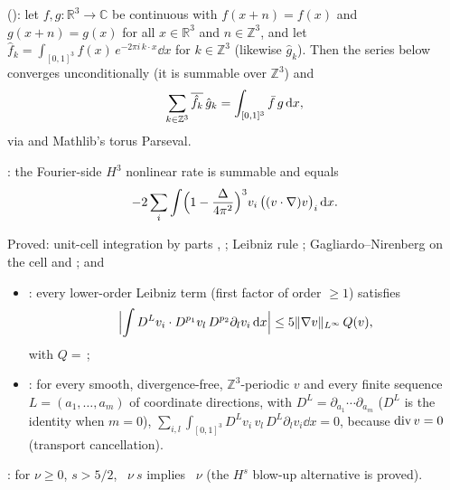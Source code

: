 \documentclass[11pt]{article}
\begin{document}
\begin{theorem}
\coined{} (): let $f,g\colon\mathbb{R}^3\to\mathbb{C}$ be continuous with $f(x+n)=f(x)$ and $g(x+n)=g(x)$ for all $x\in\mathbb{R}^3$ and $n\in\mathbb{Z}^3$, and let $\hat f_k=\int_{[0,1]^3}f(x)\,e^{-2\pi i\,k\cdot x}\dd x$ for $k\in\mathbb{Z}^3$ (likewise $\hat g_k$). Then the series below converges unconditionally (it is summable over $\mathbb{Z}^3$) and
\[
\sum_{k\in\mathbb{Z}^3}\overline{\hat f_k}\,\hat g_k = \int_{[0,1]^3}\bar f\,g\,\mathrm{d} x,
\]
via \coined{} and Mathlib's torus Parseval.
\end{theorem}
\begin{theorem}
\coined: the Fourier-side $H^3$ nonlinear rate is summable and equals
\[
-2\sum_i\int \Bigl(1-\frac{\Delta}{4\pi^2}\Bigr)^{3} v_i\,\bigl((v\cdot\nabla)v\bigr)_i\,\mathrm{d} x .
\]
\end{theorem}
\begin{theorem}[Kato--Ponce toolkit, $s=3$; \file{KatoPonce.lean}]
Proved: unit-cell integration by parts \coined, \coined; Leibniz rule \coined; Gagliardo--Nirenberg on the cell \coined{} and \coined; and
\begin{itemize}
\item {}\coined: every lower-order Leibniz term (first factor of order $\ge1$) satisfies
\[
\Bigl|\int D^L v_i\cdot D^{p_1}v_l\, D^{p_2}\partial_l v_i\,\mathrm{d} x\Bigr|\le 5\lVert\nabla v\rVert_{L^\infty}\,Q(v),
\]
with $Q=$\,\coined;
\item {}\coined: for every smooth, divergence-free, $\mathbb{Z}^3$-periodic $v$ and every finite sequence $L=(a_1,\dots,a_m)$ of coordinate directions, with $D^L=\partial_{a_1}\cdots\partial_{a_m}$ ($D^L$ is the identity when $m=0$), $\displaystyle\sum_{i,l}\int_{[0,1]^3} D^L v_i\, v_l\, D^L\partial_l v_i\dd x = 0$, because $\operatorname{div} v=0$ (transport cancellation).
\end{itemize}
\end{theorem}
\begin{theorem}
\coined: for $\nu\ge0$, $s>5/2$, ~$\nu\ s$ implies ~$\nu$ (the $H^s$ blow-up alternative is proved).
\end{theorem}
\end{document}
